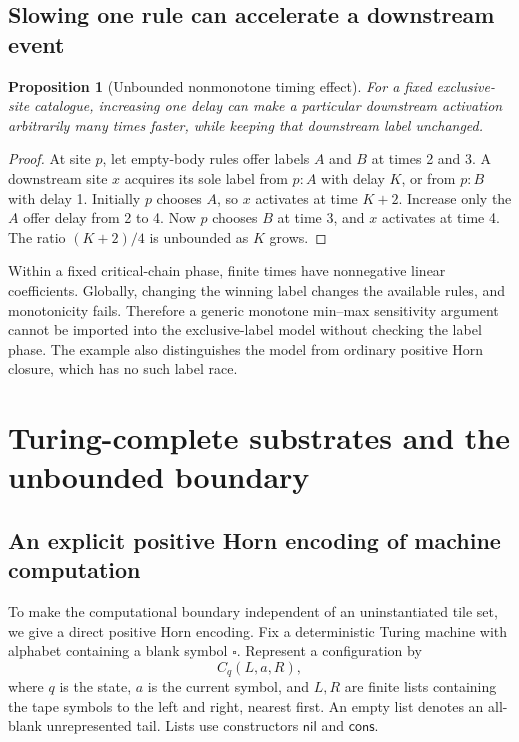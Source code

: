 \documentclass[11pt,letterpaper]{article}
\newtheorem{proposition}[theorem]{Proposition}
\theoremstyle{definition}
\theoremstyle{remark}
\begin{document}
\subsection{Slowing one rule can accelerate a downstream event}
\begin{proposition}[Unbounded nonmonotone timing effect]\label{qoc:ts:prop:slowfast}
For a fixed exclusive-site catalogue, increasing one delay can make a
particular downstream activation arbitrarily many times faster, while
keeping that downstream label unchanged.
\end{proposition}
\begin{proof}
At site $p$, let empty-body rules offer labels $A$ and $B$ at times 2 and
3. A downstream site $x$ acquires its sole label from $p:A$ with delay
$K$, or from $p:B$ with delay 1. Initially $p$ chooses $A$, so $x$
activates at time $K+2$. Increase only the $A$ offer delay from 2 to 4.
Now $p$ chooses $B$ at time 3, and $x$ activates at time 4. The ratio
$(K+2)/4$ is unbounded as $K$ grows.
\end{proof}

Within a fixed critical-chain phase, finite times have nonnegative linear
coefficients. Globally, changing the winning label changes the available
rules, and monotonicity fails. Therefore a generic monotone min--max
sensitivity argument cannot be imported into the exclusive-label model
without checking the label phase. The example also distinguishes the
model from ordinary positive Horn closure, which has no such label race.

\section{Turing-complete substrates and the unbounded boundary}\label{qoc:ts:sec:boundary}
\subsection{An explicit positive Horn encoding of machine computation}
To make the computational boundary independent of an uninstantiated tile
set, we give a direct positive Horn encoding. Fix a deterministic Turing
machine with alphabet containing a blank symbol $\square$. Represent a
configuration by
\[
 C_q(L,a,R),
\]
where $q$ is the state, $a$ is the current symbol, and $L,R$ are finite
lists containing the tape symbols to the left and right, nearest first.
An empty list denotes an all-blank unrepresented tail. Lists use
constructors $\mathsf{nil}$ and $\mathsf{cons}$.
\end{document}
